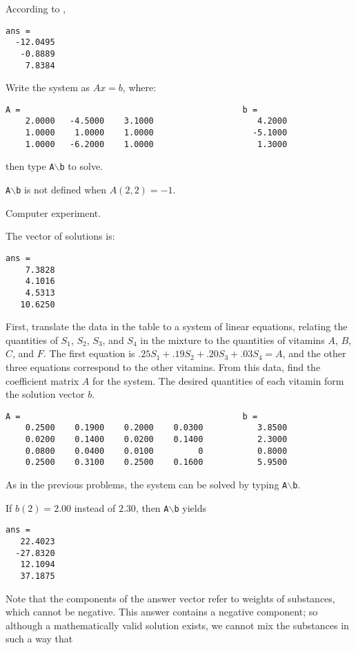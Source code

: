 \documentclass{ximera}
\begin{document}
 \ans According to \Matlabp,
\begin{verbatim}
ans =
  -12.0495
   -0.8889
    7.8384
\end{verbatim}
\soln Write the system as $Ax = b$, where:
\begin{verbatim}
A =                                             b = 
    2.0000   -4.5000    3.1000                     4.2000
    1.0000    1.0000    1.0000                    -5.1000
    1.0000   -6.2000    1.0000                     1.3000
\end{verbatim}
then type {\tt A}$\backslash${\tt b} to solve.

{\tt A}$\backslash${\tt b} is not defined when $A(2,2) = -1$.

 Computer experiment.

 \ans The vector of solutions is:
\begin{verbatim}
ans =
    7.3828
    4.1016
    4.5313
   10.6250
\end{verbatim}
\soln First, translate the data in the table to a system of linear
equations, relating the quantities of $S_1$, $S_2$, $S_3$, and $S_4$
in the mixture to the quantities of vitamins $A$, $B$, $C$, and $F$. 
The first equation is $.25S_1 + .19S_2 + .20S_3 + .03S_4 = A$, and
the other three equations correspond to the other vitamins.  From
this data, find the coefficient matrix $A$ for the system.  The desired
quantities of each vitamin form the solution vector $b$.
\begin{verbatim}
A =                                             b =
    0.2500    0.1900    0.2000    0.0300           3.8500
    0.0200    0.1400    0.0200    0.1400           2.3000
    0.0800    0.0400    0.0100         0           0.8000
    0.2500    0.3100    0.2500    0.1600           5.9500
\end{verbatim}
As in the previous problems, the system can be solved by
typing {\tt A}$\backslash${\tt b}.

\para If $b(2) = 2.00$ instead of $2.30$, then
{\tt A}$\backslash${\tt b} yields

\begin{verbatim}
ans =
   22.4023
  -27.8320
   12.1094
   37.1875
\end{verbatim}
Note that the components of the answer vector refer to weights of
substances, which cannot be negative.  This answer contains a negative
component; so although a mathematically valid solution exists, we
cannot mix the substances in such a way that
\end{document}
